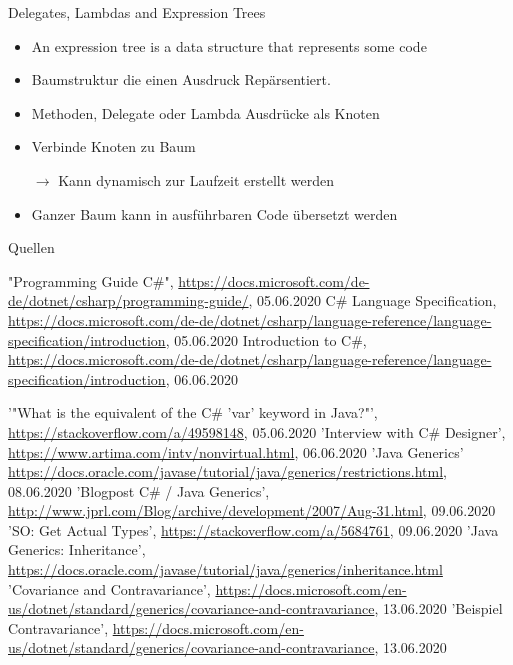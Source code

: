 \documentclass[11pt]{beamer}
\begin{document}
\begin{frame}{Delegates, Lambdas and Expression Trees}
	\begin{itemize}
		\item \glqq An expression tree is a data structure that represents some code \grqq{}
		\item Baumstruktur die einen Ausdruck Repärsentiert. 
		\item Methoden, Delegate oder Lambda Ausdrücke als Knoten
		\item Verbinde Knoten zu Baum
		\item[$\rightarrow$] Kann dynamisch zur Laufzeit erstellt werden
		\item Ganzer Baum kann in ausführbaren Code übersetzt werden
	\end{itemize}
\end{frame}



\begin{frame}{Quellen}
\begin{thebibliography}{99}
\fontsize{6pt}{7.2}\selectfont
	"Programming Guide C\#", \url{https://docs.microsoft.com/de-de/dotnet/csharp/programming-guide/}, 05.06.2020
	 C\# Language Specification, \url{https://docs.microsoft.com/de-de/dotnet/csharp/language-reference/language-specification/introduction}, 05.06.2020
   Introduction to C\#, \url{https://docs.microsoft.com/de-de/dotnet/csharp/language-reference/language-specification/introduction}, 06.06.2020

 '"What is the equivalent of the C\# 'var' keyword in Java?"', 
 \url{https://stackoverflow.com/a/49598148}, 05.06.2020
 'Interview with C\# Designer', \url{https://www.artima.com/intv/nonvirtual.html}, 06.06.2020
  'Java Generics' \url{https://docs.oracle.com/javase/tutorial/java/generics/restrictions.html}, 08.06.2020
  'Blogpost C\# / Java Generics', \url{http://www.jprl.com/Blog/archive/development/2007/Aug-31.html}, 09.06.2020
  'SO: Get Actual Types', \url{https://stackoverflow.com/a/5684761}, 09.06.2020
  'Java Generics: Inheritance', \url{https://docs.oracle.com/javase/tutorial/java/generics/inheritance.html}
  'Covariance and Contravariance', \url{https://docs.microsoft.com/en-us/dotnet/standard/generics/covariance-and-contravariance}, 13.06.2020
  'Beispiel Contravariance', \url{https://docs.microsoft.com/en-us/dotnet/standard/generics/covariance-and-contravariance}, 13.06.2020
\end{thebibliography}
\end{frame}
\end{document}
